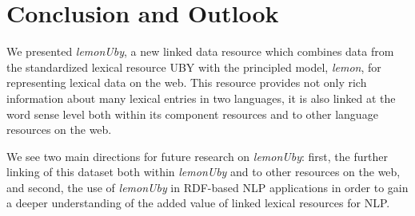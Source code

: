 \section{Conclusion and Outlook}
\noindent
We presented \emph{le\-mon\-U\-by}, a new linked data resource which
combines data from the standardized lexical resource UBY with the principled model, \emph{lemon},
for representing lexical data on the web. This resource provides not only
rich information about many lexical entries in two languages, it is also
 linked at the word sense level both within its component resources and to other
language resources on the web.

We see two main directions for future research on \emph{le\-mon\-U\-by}: first, the 
further linking of this dataset both within \emph{le\-mon\-U\-by} and to other
resources on the web, and second, the use of \emph{le\-mon\-U\-by}
in RDF-based NLP applications in order to gain a deeper understanding of the added value of linked lexical resources
for NLP.
